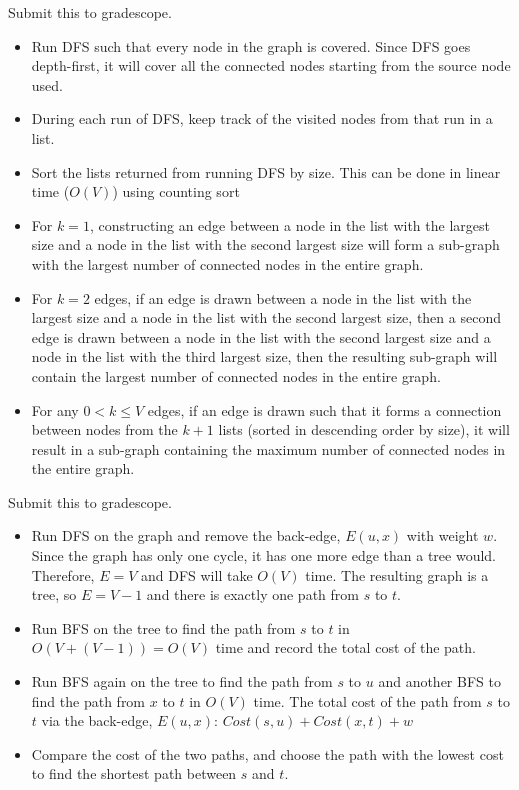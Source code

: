 \documentclass[12pt,twoside]{article}
\begin{document}
\begin{problems}
\problem  Submit this to gradescope.%
\begin{problemparts}
\problempart 
\begin{itemize}
	\item Run DFS such that every node in the graph is covered. Since DFS goes depth-first, it will cover all the connected nodes starting from the source node used. 
	\item During each run of DFS, keep track of the visited nodes from that run in a list.
	\item Sort the lists returned from running DFS by size. This can be done in linear time ($ O(V) $) using counting sort
	\item For $ k=1 $, constructing an edge between a node in the list with the largest size and a node in the list with the second largest size will form a sub-graph with the largest number of connected nodes in the entire graph.
\end{itemize}
\problempart 
\begin{itemize}
	\item For $ k=2 $ edges, if an edge is drawn between a node in the list with the largest size and a node in the list with the second largest size, then a second edge is drawn between a node in the list with the second largest size and a node in the list with the third largest size, then the resulting sub-graph will contain the largest number of connected nodes in the entire graph. 
	\item For any $ 0 < k \leq V $ edges, if an edge is drawn such that it forms a connection between nodes from the $k+1$ lists (sorted in descending order by size), it will result in a sub-graph containing the maximum number of connected nodes in the entire graph. 
\end{itemize}
\end{problemparts}

\problem  Submit this to gradescope. %

\begin{problemparts}
\begin{itemize}
	\item Run DFS on the graph and remove the back-edge, $E(u,x) $ with weight $w$. Since the graph has only one cycle, it has one more edge than a tree would. Therefore, $E=V$ and DFS will take $O(V)$ time. The resulting graph is a tree, so $ E = V-1 $ and there is exactly one path from $s$ to $t$. 
	\item Run BFS on the tree to find the path from $s$ to $t$ in $O(V+(V-1)) = O(V)$ time and record the total cost of the path.
	\item Run BFS again on the tree to find the path from $s$ to $u$ and another BFS to find the path from $x$ to $t$ in $O(V)$ time. The total cost of the path from $s$ to $t$ via the back-edge, $E(u,x)$: $Cost(s,u) + Cost(x,t) + w$
	\item Compare the cost of the two paths, and choose the path with the lowest cost to find the shortest path between $s$ and $t$. 
	

\end{itemize}
\end{problemparts}
\end{problems}
\end{document}
